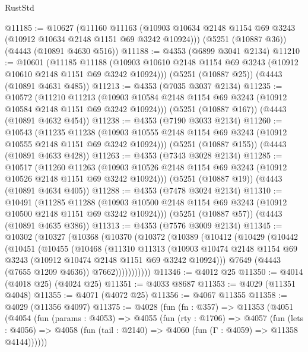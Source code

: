 \begin{lexlean}{RustStd}
\begin{coremodule}
@11185 := @10627
    (@11160
      @11163
      (@10903 @10634 @2148 @1154 @69 @3243 (@10912 @10634 @2148 @1151 @69 @3242 @10924)))
    (@5251 (@10887 @36))
    (@4443 (@10891 @4630 @516))
@11188 := @4353 (@6899 @3041 @2134)
@11210 := @10601
    (@11185
      @11188
      (@10903 @10610 @2148 @1154 @69 @3243 (@10912 @10610 @2148 @1151 @69 @3242 @10924)))
    (@5251 (@10887 @25))
    (@4443 (@10891 @4631 @485))
@11213 := @4353 (@7035 @3037 @2134)
@11235 := @10572
    (@11210
      @11213
      (@10903 @10584 @2148 @1154 @69 @3243 (@10912 @10584 @2148 @1151 @69 @3242 @10924)))
    (@5251 (@10887 @167))
    (@4443 (@10891 @4632 @454))
@11238 := @4353 (@7190 @3033 @2134)
@11260 := @10543
    (@11235
      @11238
      (@10903 @10555 @2148 @1154 @69 @3243 (@10912 @10555 @2148 @1151 @69 @3242 @10924)))
    (@5251 (@10887 @155))
    (@4443 (@10891 @4633 @428))
@11263 := @4353 (@7343 @3028 @2134)
@11285 := @10517
    (@11260
      @11263
      (@10903 @10526 @2148 @1154 @69 @3243 (@10912 @10526 @2148 @1151 @69 @3242 @10924)))
    (@5251 (@10887 @19))
    (@4443 (@10891 @4634 @405))
@11288 := @4353 (@7478 @3024 @2134)
@11310 := @10491
    (@11285
      @11288
      (@10903 @10500 @2148 @1154 @69 @3243 (@10912 @10500 @2148 @1151 @69 @3242 @10924)))
    (@5251 (@10887 @57))
    (@4443 (@10891 @4635 @386))
@11313 := @4353 (@7576 @3009 @2134)
@11345 := @10302
    (@10327
      (@10368
        (@10370
          (@10372
            (@10389
              (@10412
                (@10429
                  (@10442
                    (@10451
                      (@10455
                        (@10468
                          (@11310
                            @11313
                            (@10903
                              @10474
                              @2148
                              @1154
                              @69
                              @3243
                              (@10912 @10474 @2148 @1151 @69 @3242 @10924)))
                          @7649
                          (@4443 (@7655 @1209 @4636))
                          @7662)))))))))))
@11346 := @4012 @25
@11350 := @4014 (@4018 @25) (@4024 @25)
@11351 := @4033 @8687
@11353 := @4029 (@11351 @4048)
@11355 := @4071 (@4072 @25)
@11356 := @4067 @11355
@11358 := @4029 (@11356 @4097)
@11375 := @4028
    (fun (fn : @357) =>
    @11353
      (@4051
        (@4054
          (fun (params : @4053) =>
          @4055
            (fun (rty : @1706) =>
            @4057
              (fun (lets : @4056) =>
              @4058 (fun (tail : @2140) => @4060 (fun (Γ : @4059) => @11358 @4144))))))

\end{coremodule}
\end{lexlean}
